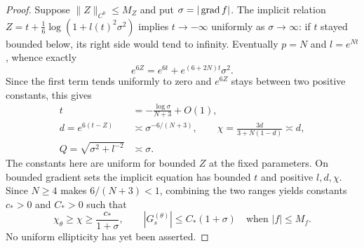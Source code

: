 \begin{proof}
Suppose $\|Z\|_{C^0}\le M_Z$ and put $\sigma=|\operatorname{grad} f|$.
The implicit relation $Z=t+\frac16\log(1+l(t)^2\sigma^2)$ implies
$t\to-\infty$ uniformly as $\sigma\to\infty$: if $t$ stayed bounded
below, its right side would tend to infinity.  Eventually $p=N$ and
$l=e^{Nt}$, whence exactly
\begin{equation}\label{four:maximal:exist:large-gradient-identity}
 e^{6Z}=e^{6t}+e^{(6+2N)t}\sigma^2.
\end{equation}
Since the first term tends uniformly to zero and $e^{6Z}$ stays between
two positive constants, this gives
\begin{equation}\label{four:maximal:exist:large-gradient-asymptotics}
 \begin{split}
 t&=-\frac{\log\sigma}{N+3}+O(1),\\
 d=e^{6(t-Z)}&\asymp\sigma^{-6/(N+3)},\qquad
 \chi=\frac{3d}{3+N(1-d)}\asymp d,\\
 Q=\sqrt{\sigma^2+l^{-2}}&\asymp\sigma.
 \end{split}
\end{equation}
The constants here are uniform for bounded $Z$ at the fixed parameters.
On bounded gradient sets the implicit equation has bounded $t$ and
positive $l,d,\chi$.  Since $N\ge4$ makes $6/(N+3)<1$, combining the
two ranges yields constants $c_*>0$ and $C_*>0$ such that
\begin{equation}\label{four:maximal:exist:linear-growth}
 \chi_\theta\ge\chi\ge\frac{c_*}{1+\sigma},\qquad
 |G_s^{(\theta)}|\le C_*(1+\sigma)
       \quad\text{when } |f|\le M_f.
\end{equation}
No uniform ellipticity has yet been asserted.


\end{proof}

